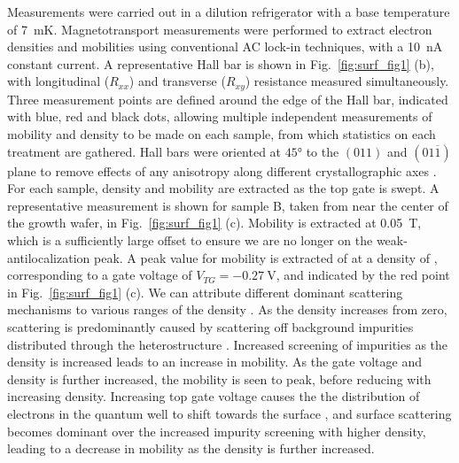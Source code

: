 Measurements were carried out in a dilution refrigerator with a base temperature of \SI{7}{\milli\kelvin}. Magnetotransport measurements were performed to extract electron densities and mobilities using conventional AC lock-in techniques, with a \SI{10}{\nano\ampere} constant current. A representative Hall bar is shown in Fig.~\ref{fig:surf_fig1} (b), with longitudinal ($R_{xx}$) and transverse ($R_{xy}$) resistance measured simultaneously. Three measurement points are defined around the edge of the Hall bar, indicated with blue, red and black dots, allowing multiple independent measurements of mobility and density to be made on each sample, from which statistics on each treatment are gathered. Hall bars were oriented at $\ang{45}$ to the $(011)$ and $(01\overline{1})$ plane to remove effects of any anisotropy along different crystallographic axes \cite{PhysRevB.67.045309,PhysRevB.77.235307}. For each sample, density and mobility are extracted as the top gate is swept. A representative measurement is shown for sample B, taken from near the center of the growth wafer, in Fig.~\ref{fig:surf_fig1} (c). Mobility is extracted at \SI{0.05}{\tesla}, which is a sufficiently large offset to ensure we are no longer on the weak-antilocalization peak. A peak value for mobility is extracted of  at a density of , corresponding to a gate voltage of $V_{TG} = \SI{-0.27}{\volt}$, and indicated by the red point in Fig.~\ref{fig:surf_fig1} (c). We can attribute different dominant scattering mechanisms to various ranges of the density \cite{Matsumoto_1974,PhysRevB.32.8126,PhysRevB.16.4446}. As the density increases from zero, scattering is predominantly caused by scattering off background impurities distributed through the heterostructure \cite{scattering}. Increased screening of impurities as the density is increased leads to an increase in mobility. As the gate voltage and density is further increased, the mobility is seen to peak, before reducing with increasing density. Increasing top gate voltage causes the the distribution of electrons in the quantum well to shift towards the surface \cite{doi:10.1063/1.119829,PhysRevB.93.235312}, and surface scattering becomes dominant over the increased impurity screening with higher density, leading to a decrease in mobility as the density is further increased.


